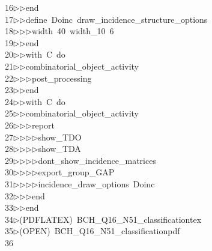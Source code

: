 \begin{tabbing}
16\>$\triangleright$\>$\triangleright$\>end\ \\[0pt]
17\>$\triangleright$\>$\triangleright$\>define\ Doinc\ draw\_incidence\_structure\_options\ \\[0pt]
18\>$\triangleright$\>$\triangleright$\>$\triangleright$\>width\ 40\ width\_10\ 6\ \\[0pt]
19\>$\triangleright$\>$\triangleright$\>end\ \\[0pt]
20\>$\triangleright$\>$\triangleright$\>with\ C\ do\ \\[0pt]
21\>$\triangleright$\>$\triangleright$\>combinatorial\_object\_activity\ \\[0pt]
22\>$\triangleright$\>$\triangleright$\>$\triangleright$\>post\_processing\ \\[0pt]
23\>$\triangleright$\>$\triangleright$\>end\ \\[0pt]
24\>$\triangleright$\>$\triangleright$\>with\ C\ do\ \\[0pt]
25\>$\triangleright$\>$\triangleright$\>combinatorial\_object\_activity\ \\[0pt]
26\>$\triangleright$\>$\triangleright$\>$\triangleright$\>report\ \\[0pt]
27\>$\triangleright$\>$\triangleright$\>$\triangleright$\>$\triangleright$\>show\_TDO\ \\[0pt]
28\>$\triangleright$\>$\triangleright$\>$\triangleright$\>$\triangleright$\>show\_TDA\ \\[0pt]
29\>$\triangleright$\>$\triangleright$\>$\triangleright$\>$\triangleright$\>dont\_show\_incidence\_matrices\ \\[0pt]
30\>$\triangleright$\>$\triangleright$\>$\triangleright$\>$\triangleright$\>export\_group\_GAP\ \\[0pt]
31\>$\triangleright$\>$\triangleright$\>$\triangleright$\>$\triangleright$\>incidence\_draw\_options\ Doinc\ \\[0pt]
32\>$\triangleright$\>$\triangleright$\>$\triangleright$\>end\ \\[0pt]
33\>$\triangleright$\>$\triangleright$\>end\\[0pt]
34\>$\triangleright$\>(PDFLATEX)\ BCH\_Q16\_N51\_classificationtex\\[0pt]
35\>$\triangleright$\>(OPEN)\ BCH\_Q16\_N51\_classificationpdf\\[0pt]
36\>\end{tabbing}
